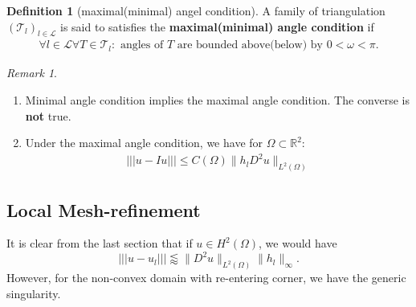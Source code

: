 \documentclass[a4paper,12pt,oneside,fleqn]{book}
\theoremstyle{definition}
\newtheorem{definition}{Definition}[section]
\theoremstyle{remark}
\newtheorem*{remark}{Remark}
\begin{document}
\begin{definition}[maximal(minimal) angel condition]
	A family of triangulation $(\mathcal{T}_l)_{l \in \mathcal{L}}$ is said to satisfies the \textbf{maximal(minimal) angle condition} if 
	\begin{align*}
		\forall l \in \mathcal{L} \forall T \in \mathcal{T}_l: \text{ angles of $T$ are bounded above(below) by }0 <  \omega < \pi.  
	\end{align*}
\end{definition}
\begin{remark}
\quad
\begin{enumerate}
	\item Minimal angle condition implies the maximal angle condition. The converse is \textbf{not} true. 
	\item Under the maximal angle condition, we have for $\Omega \subset \mathbb{R}^2$:
	\begin{align*}
		|||u - Iu||| \le C(\Omega) \|h_l D^2 u \|_{L^2(\Omega)}
	\end{align*}
\end{enumerate}	
\end{remark}



\subsection{Local Mesh-refinement}
It is clear from the last section that if $u \in H^2(\Omega)$, we would have
\begin{equation*}
	|||u - u_l||| \lessapprox \|D^2u\|_{L^2(\Omega)} \|h_l\|_\infty.
\end{equation*}
However, for the non-convex domain with re-entering corner, we have the generic singularity. 
\end{document}
